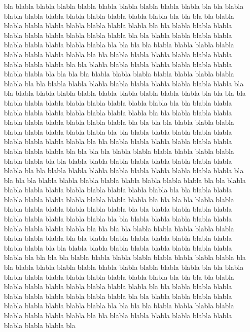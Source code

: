 \documentclass[12pt,a4paper,english]{book}
\begin{document}
bla blabla blabla blabla blabla blabla blabla blabla blabla blabla bla
bla blabla blabla blabla blabla blabla blabla blabla blabla blabla bla
bla bla
bla blabla blabla blabla blabla blabla blabla blabla blabla bla
bla blabla blabla blabla blabla blabla blabla blabla blabla blabla bla
bla blabla blabla blabla blabla blabla blabla blabla blabla blabla bla
bla bla
bla blabla blabla blabla blabla blabla blabla blabla blabla bla
bla blabla blabla blabla blabla blabla blabla blabla blabla blabla bla
bla blabla blabla blabla blabla blabla blabla blabla blabla blabla bla
bla bla
bla blabla blabla blabla blabla blabla blabla blabla blabla bla
bla blabla blabla blabla blabla blabla blabla blabla blabla blabla bla
bla blabla blabla blabla blabla blabla blabla blabla blabla blabla bla
bla bla
bla blabla blabla blabla blabla blabla blabla blabla blabla bla
bla blabla blabla blabla blabla blabla blabla blabla blabla blabla bla
bla blabla blabla blabla blabla blabla blabla blabla blabla blabla bla
bla bla
bla blabla blabla blabla blabla blabla blabla blabla blabla bla
bla blabla blabla blabla blabla blabla blabla blabla blabla blabla bla
bla blabla blabla blabla blabla blabla blabla blabla blabla blabla bla
bla bla
bla blabla blabla blabla blabla blabla blabla blabla blabla bla
bla blabla blabla blabla blabla blabla blabla blabla blabla blabla bla
bla blabla blabla blabla blabla blabla blabla blabla blabla blabla bla
bla bla
bla blabla blabla blabla blabla blabla blabla blabla blabla bla
bla blabla blabla blabla blabla blabla blabla blabla blabla blabla bla
bla blabla blabla blabla blabla blabla blabla blabla blabla blabla bla
bla bla
bla blabla blabla blabla blabla blabla blabla blabla blabla bla
bla blabla blabla blabla blabla blabla blabla blabla blabla blabla bla
bla blabla blabla blabla blabla blabla blabla blabla blabla blabla bla
bla bla
bla blabla blabla blabla blabla blabla blabla blabla blabla bla
bla blabla blabla blabla blabla blabla blabla blabla blabla blabla bla
bla blabla blabla blabla blabla blabla blabla blabla blabla blabla bla
bla bla
bla blabla blabla blabla blabla blabla blabla blabla blabla bla
bla blabla blabla blabla blabla blabla blabla blabla blabla blabla bla
bla blabla blabla blabla blabla blabla blabla blabla blabla blabla bla
bla bla
bla blabla blabla blabla blabla blabla blabla blabla blabla bla
bla blabla blabla blabla blabla blabla blabla blabla blabla blabla bla
bla blabla blabla blabla blabla blabla blabla blabla blabla blabla bla
bla bla
bla blabla blabla blabla blabla blabla blabla blabla blabla bla
bla blabla blabla blabla blabla blabla blabla blabla blabla blabla bla
\end{document}
